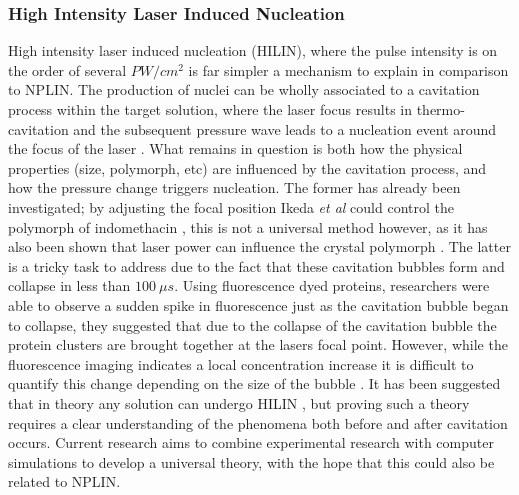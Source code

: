 \subsubsection{High Intensity Laser Induced Nucleation}
High intensity laser induced nucleation (HILIN), where the pulse intensity 
is on the order of several $PW/cm^2$ is far simpler a mechanism to explain 
in comparison to NPLIN. The production of nuclei can be wholly associated 
to a cavitation process within the target solution, where the laser focus 
results in thermo-cavitation and the subsequent pressure wave leads to
a nucleation event around the focus of the laser \cite{Yoshikawa2005, 
Soare2011, Barber2019}. What remains in question is both how the physical 
properties (size, polymorph, etc) are influenced by the cavitation process, 
and how the pressure change triggers nucleation. The former has already 
been investigated; by adjusting the focal position Ikeda \textit{et al} 
could control the polymorph of indomethacin \cite{Ikeda2015}, this is not 
a universal method however, as it has also been shown that laser power can 
influence the crystal polymorph \cite{Wang2010}. The latter is a tricky 
task to address due to the fact that these cavitation bubbles form and 
collapse in less than $100\ \mu s$. Using fluorescence dyed proteins, 
researchers were able to observe a sudden spike in fluorescence just 
as the cavitation bubble began to collapse, they suggested that due 
to the collapse of the cavitation bubble the protein clusters are 
brought together at the lasers focal point. However, while the fluorescence 
imaging indicates a local concentration increase it is difficult to 
quantify this change depending on the size of the bubble \cite{Korede2023}. 
It has been suggested that in theory any solution can undergo HILIN 
\cite{Korede2023}, but proving such a theory requires a clear 
understanding of the phenomena both before and after cavitation occurs. 
Current research aims to combine experimental research with computer 
simulations to develop a universal theory, with the hope that this could 
also be related to NPLIN.   

